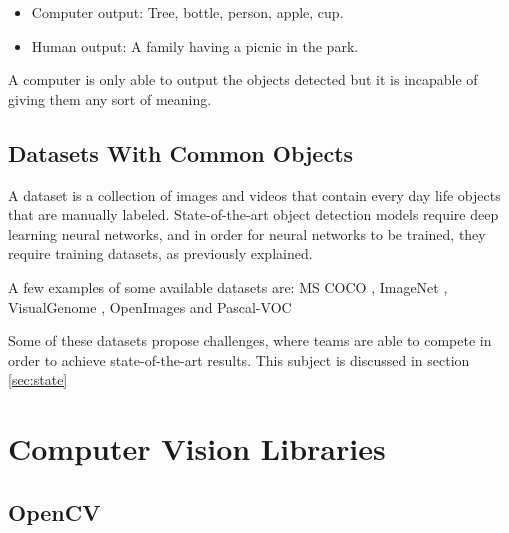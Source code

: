     \begin{itemize}
        
        \item Computer output: Tree, bottle, person, apple, cup.
        \item Human output: A family having a picnic in the park.
    \end{itemize}
     
    \par A computer is only able to output the objects detected but it is incapable of giving them any sort of meaning.




    \subsection{Datasets With Common Objects}

    \label{dataset}

    \par A dataset is a collection of images and videos that contain every day life objects that are manually labeled. State-of-the-art object detection models require deep learning neural networks, and in order for neural networks to be trained, they  require training datasets, as previously explained.  

    \par A few examples of some available datasets are:  MS COCO \cite{Lin2014}, ImageNet \cite{Takamitsu1978} , VisualGenome \cite{Language2015}, OpenImages \cite{Kuznetsova2018} and Pascal-VOC \cite{Everingham2010}

    \par Some of these datasets propose challenges, where teams are able to compete in order to achieve state-of-the-art results. This subject is discussed in section \ref{sec:state}



\section{Computer Vision Libraries}
\label{sec:libraries}


    \subsection{OpenCV}

